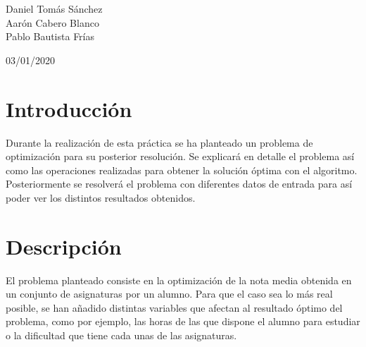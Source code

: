 \documentclass[11pt, a4paper, titlepage]{article}
\begin{document}
	\begin{titlepage}
    	\begin{center}
        	\hrulefill

        	\vspace{0.5cm}
        	{\bf\fontsize{25}{0}{\selectfont{Optimización Heurística\\[0.5cm]}}}
        	\fontsize{15}{0}{\selectfont{Optimizar una calificación\\[0.5cm]}}
        	\hrulefill
        	\vspace{6.0cm}
    	\end{center}

    	\centering
    	{\Large Daniel Tomás Sánchez\\ Aarón Cabero Blanco \\ Pablo Bautista 				Frías \par}
    	\vspace{2cm}
    	{\Large 03/01/2020 \par}
	\end{titlepage}

\newpage


\tableofcontents

\newpage

\section{Introducción}
Durante la realización de esta práctica se ha planteado un problema de optimización para su posterior resolución. Se explicará en detalle el problema así como las operaciones realizadas para obtener la solución óptima con el algoritmo. Posteriormente se resolverá el problema con diferentes datos de entrada para así poder ver los distintos resultados obtenidos.


\section{Descripción}
El problema planteado consiste en la optimización de la nota media obtenida en un conjunto de asignaturas por un alumno. Para que el caso sea lo más real posible, se han añadido distintas variables que afectan al resultado óptimo del problema, como por ejemplo, las horas de las que dispone el alumno para estudiar o la dificultad que tiene cada unas de las asignaturas.

\vspace{5mm}
\end{document}
